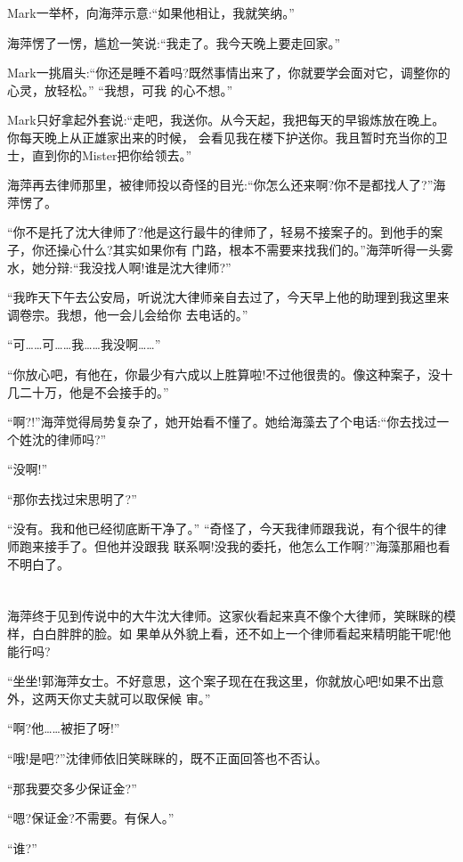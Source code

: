\documentclass[11pt,a4paper,onecolumn]{article}
\begin{document}
Mark一举杯，向海萍示意:``如果他相让，我就笑纳。''

海萍愣了一愣，尴尬一笑说:``我走了。我今天晚上要走回家。''

Mark一挑眉头:``你还是睡不着吗?既然事情出来了，你就要学会面对它，调整你的心灵，放轻松。'' ``我想，可我
的心不想。''

Mark只好拿起外套说:``走吧，我送你。从今天起，我把每天的早锻炼放在晚上。你每天晚上从正雄家出来的时候，
会看见我在楼下护送你。我且暂时充当你的卫士，直到你的Mister把你给领去。''

海萍再去律师那里，被律师投以奇怪的目光:``你怎么还来啊?你不是都找人了?''海萍愣了。

``你不是托了沈大律师了?他是这行最牛的律师了，轻易不接案子的。到他手的案子，你还操心什么?其实如果你有
门路，根本不需要来找我们的。''海萍听得一头雾水，她分辩:``我没找人啊!谁是沈大律师?''

``我昨天下午去公安局，听说沈大律师亲自去过了，今天早上他的助理到我这里来调卷宗。我想，他一会儿会给你
去电话的。''

``可……可……我……我没啊……''

``你放心吧，有他在，你最少有六成以上胜算啦!不过他很贵的。像这种案子，没十几二十万，他是不会接手的。''

``啊?!''海萍觉得局势复杂了，她开始看不懂了。她给海藻去了个电话:``你去找过一个姓沈的律师吗?''

``没啊!''

``那你去找过宋思明了?''

``没有。我和他已经彻底断干净了。'' ``奇怪了，今天我律师跟我说，有个很牛的律师跑来接手了。但他并没跟我
联系啊!没我的委托，他怎么工作啊?''海藻那厢也看不明白了。

\section[\thesection]{}

海萍终于见到传说中的大牛\myrule 沈大律师。这家伙看起来真不像个大律师，笑眯眯的模样，白白胖胖的脸。如
果单从外貌上看，还不如上一个律师看起来精明能干呢!他能行吗?

``坐坐!郭海萍女士。不好意思，这个案子现在在我这里，你就放心吧!如果不出意外，这两天你丈夫就可以取保候
审。''

``啊?他……被拒了呀!''

``哦!是吧?''沈律师依旧笑眯眯的，既不正面回答也不否认。

``那我要交多少保证金?''

``嗯?保证金?不需要。有保人。''

``谁?''
\end{document}
